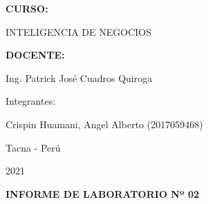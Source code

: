 \documentclass[12pt,letterpaper]{article}
\begin{document}
\begin{titlepage}
\begin{center}
\vspace*{0.3in}
\begin{Large}
\textbf{CURSO:} \\
\end{Large}

\vspace*{0.1in}
\begin{large}
INTELIGENCIA DE NEGOCIOS\\
\end{large}

\vspace*{0.3in}
\begin{Large}
\textbf{DOCENTE:} \\
\end{Large}

\vspace*{0.1in}
\begin{large}
Ing. Patrick José Cuadros Quiroga\\
\end{large}

\vspace*{0.2in}
\vspace*{0.1in}
\begin{large}
Integrantes: \\
\begin{flushleft}

    Crispin Huamani, Angel Alberto		\hfill	(2017059468) \\

\end{flushleft}
\end{large}
\vspace*{0.1in}
\begin{large}
Tacna - Perú\\
\end{large}
\vspace*{0.1in}
\begin{large}
2021\\
\end{large}

\end{center}

\end{titlepage}


\vspace*{0.1in}

\begin{LARGE}
    \begin{center}
        \textbf{INFORME DE LABORATORIO Nº 02} \\
    \end{center}
\end{LARGE}
\vspace*{0.1in}
\end{document}
